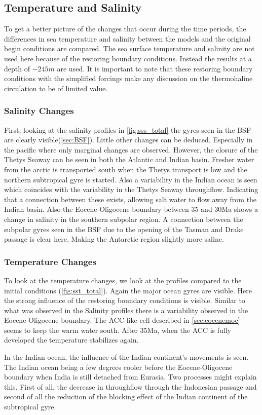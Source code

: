 \subsection{Temperature and Salinity}\label{sec:temp+sal}
To get a better picture of the changes that occur during the time periods, the differences in sea temperature and salinity between the models and the original begin conditions are compared. The sea surface temperature and salinity are not used here because of the restoring boundary conditions. Instead the results at a depth of $-245m$ are used. It is important to note that these restoring boundary conditions with the simplified forcings make any discussion on the thermohaline circulation to be of limited value.

\subsubsection{Salinity Changes}
First, looking at the salinity profiles in \cref{fig:sss_total} the gyres seen in the BSF are clearly visible(\cref{sec:BSF}).
Little other changes can be deduced. Especially in the pacific where only marginal changes are observed. However, the closure of the Thetys Seaway can be seen in both the Atlantic and Indian basin. Fresher water from the arctic is transported south when the Thetys transport is low and the northern subtropical gyre is started. Also a variability in the Indian ocean is seen which coincides with the variability in the Thetys Seaway throughflow. Indicating that a connection between these exists, allowing salt water to flow away from the Indian basin. Also the Eocene-Oligocene boundary between 35 and 30Ma shows a change in salinity in the southern subpolar region. A connection between the subpolar gyres seen in the BSF due to the opening of the Tasman and Drake passage is clear here. Making the Antarctic region slightly more saline. 

\subsubsection{Temperature Changes}
To look at the temperature changes, we look at the profiles compared to the initial conditions (\cref{fig:sst_total}). Again the major ocean gyres are visible. Here the strong influence of the restoring boundary conditions is visible. Similar to what was observed in the Salinity profiles there is a variability observed in the Eocene-Oligocene boundary. The ACC-like cell described in \cref{sec:eocenemoc} seems to keep the warm water south. After 35Ma, when the ACC is fully developed the temperature stabilizes again.

In the Indian ocean, the influence of the Indian continent's movements is seen. The Indian ocean being a few degrees cooler before the Eocene-Oligocene boundary when India is still detached from Eurasia. Two processes might explain this. First of all, the decrease in throughflow through the Indonesian passage and second of all the reduction of the blocking effect of the Indian continent of the subtropical gyre.